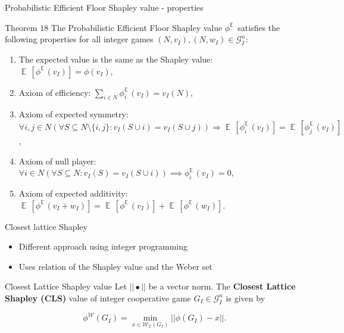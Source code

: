 \documentclass{beamer}
\newcommand{\Z}{\mathbb{Z}}
\DeclareMathOperator{\E}{\mathbb{E}\,}
\begin{document}


\begin{frame}{Probabilistic Efficient Floor Shapley value - properties}
    \pause

    \begin{block}{Theorem $18$}
        The Probabilistic Efficient Floor Shapley value $\phi^{\E}$  satisfies the following properties for all integer games $(N,v_I),(N,w_I) \in \mathcal{G}_I^n$:
        \begin{enumerate}
            \item The expected value is the same as the Shapley value: $\E[\phi^{\E}(v_I)] = \phi(v_I)$,
            \item Axiom of efficiency: $\sum_{i \in N}\phi_{i}^{\E}(v_I) = v_I(N)$,
            \item Axiom of expected symmetry: $\forall i,j \in N (\forall S \subseteq N \setminus \{i,j\}: v_I(S \cup i) = v_I(S \cup j)) \Rightarrow \E[\phi_{i}^{\E}(v_I)] = \E[\phi_{j}^{\E}(v_I)]$,
            \item Axiom of null player: $\forall i \in N(\forall S \subseteq N: v_I(S)=v_I(S \cup i)) \implies \phi_{i}^{\E}(v_I) = 0$,
            \item Axiom of expected additivity: $\E[\phi^{\E}(v_I+w_I)] = \E[\phi^{\E}(v_I)] + \E[\phi^{\E}(w_I)]$.
        \end{enumerate}
    \end{block}

\end{frame}



\begin{frame}{Closest lattice Shapley}
    \pause
    \begin{itemize}
        \item Different approach using integer programming
        \pause
        \item Uses relation of the Shapley value and the Weber set
    \end{itemize}

    \pause

    \begin{block}{Closest Lattice Shapley value}
        Let $||\bullet||$ be a vector norm. The \textbf{Closest Lattice Shapley (CLS)} value of integer cooperative game $G_I \in \mathcal{G}_I^n$ is given by

        \begin{displaymath}
            \phi^\mathcal{W}(G_I)  = \min_{x \in \mathcal{W}_\Z(G_I)} ||\phi(G_I) - x||.
        \end{displaymath}
    \end{block}
\end{frame}
\end{document}
